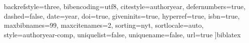 	backrefstyle=three,		%
	bibencoding=utf8,		%
	citestyle=authoryear,	%
	defernumbers=true,		%
	dashed=false,			%
	date=year,				%
	doi=true,				%
	giveninits=true,		%
	hyperref=true,			%
	isbn=true,				%
	maxbibnames=99,			%
	maxcitenames=2,			%
	sorting=nyt,			%
	sortlocale=auto,		%
	style=authoryear-comp,		%
	uniquelist=false,		%
	uniquename=false,		%
	url=true				%
]{biblatex}
\usepackage[
	autostyle=true,			%
	strict=true				%
]{csquotes}					%
\usepackage[
]{acro}						%
\usepackage{imakeidx}		%
\usepackage[
	intoc,					%
	nomentbl,				%
	noprefix,				%
]{nomencl}					%
\usepackage{listings}		%
\usepackage{xurl}			%


\usepackage{animate}
\usepackage{subfig}


